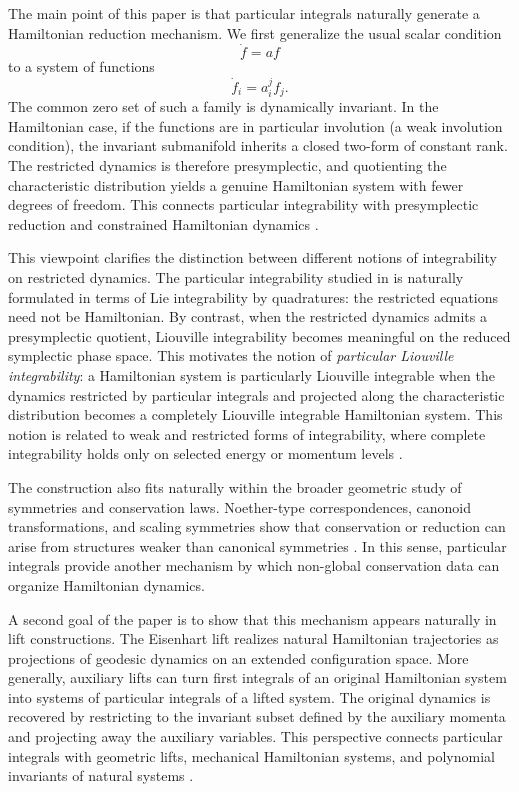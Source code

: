 \documentclass[10pt,a4paper]{article}
\begin{document}
The main point of this paper is that particular integrals naturally generate a Hamiltonian reduction mechanism. We first generalize the usual scalar condition
\[
\dot f=af
\]
to a system of functions
\[
\dot f_i=a_i^j f_j.
\]
The common zero set of such a family is dynamically invariant. In the Hamiltonian case, if the functions are in particular involution (a weak involution condition), the invariant submanifold inherits a closed two-form of constant rank. The restricted dynamics is therefore presymplectic, and quotienting the characteristic distribution yields a genuine Hamiltonian system with fewer degrees of freedom. This connects particular integrability with presymplectic reduction and constrained Hamiltonian dynamics \cite{carinena1985canonical,grabowska2023reductions,libermann2012symplectic}.

This viewpoint clarifies the distinction between different notions of integrability on restricted dynamics. The particular integrability studied in \cite{escobar2024particular} is naturally formulated in terms of Lie integrability by quadratures: the restricted equations need not be Hamiltonian. By contrast, when the restricted dynamics admits a presymplectic quotient, Liouville integrability becomes meaningful on the reduced symplectic phase space. This motivates the notion of \emph{particular Liouville integrability}: a Hamiltonian system is particularly Liouville integrable when the dynamics restricted by particular integrals and projected along the characteristic distribution becomes a completely Liouville integrable Hamiltonian system. This notion is related to weak and restricted forms of integrability, where complete integrability holds only on selected energy or momentum levels \cite{rosquist1995invariants,pucacco2004non}.

The construction also fits naturally within the broader geometric study of symmetries and conservation laws. Noether-type correspondences, canonoid transformations, and scaling symmetries show that conservation or reduction can arise from structures weaker than canonical symmetries \cite{KS2011,CR88,RS2015,azuaje2024scaling}. In this sense, particular integrals provide another mechanism by which non-global conservation data can organize Hamiltonian dynamics.

A second goal of the paper is to show that this mechanism appears naturally in lift constructions. The Eisenhart lift realizes natural Hamiltonian trajectories as projections of geodesic dynamics on an extended configuration space. More generally, auxiliary lifts can turn first integrals of an original Hamiltonian system into systems of particular integrals of a lifted system. The original dynamics is recovered by restricting to the invariant subset defined by the auxiliary momenta and projecting away the auxiliary variables. This perspective connects particular integrals with geometric lifts, mechanical Hamiltonian systems, and polynomial invariants of natural systems \cite{godbillon1969geometrie,maciejewski2004darboux,hietarinta1987direct}.
\end{document}
